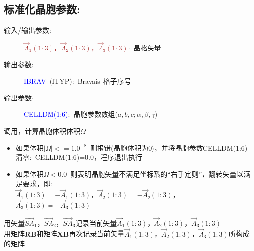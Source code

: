 \documentclass{article}      %
\begin{document}
\subsection{标准化晶胞参数:}
\begin{description}
	\item[输入/输出参数:~]\textcolor{brown}{$\vec A_1(1:3)$，$\vec A_2(1:3)$，$\vec A_3(1:3)$}:~晶格矢量
	\item[输出参数:~]\textcolor{blue}{\textrm{IBRAV~}}(ITYP):~\textrm{Bravais~}格子序号
	\item[输出参数:~]\textcolor{blue}{\textrm{CELLDM}(1:6)}:~晶胞参数数组($a,b,c;\alpha,\beta,\gamma$)
\end{description}
调用，计算晶胞体积体积$\Omega$
\begin{itemize}
	\item 如果体积$|\Omega|<=1.0^{-8}$~则报错(晶胞体积为0)，并将晶胞参数\textrm{CELLDM}(1:6)清零:~\textrm{CELLDM(1:6)}=0.0，程序退出执行
	\item 如果体积$\Omega< 0.0$~则表明晶胞矢量不满足坐标系的“右手定则”，翻转矢量以满足要求，即:\\$\vec A_1(1:3)=-\vec A_1(1:3)$，$\vec A_2(1:3)=-\vec A_2(1:3)$，$\vec A_3(1:3)=-\vec A_3(1:3)$
\end{itemize}
用矢量$\vec{SA}_1$，$\vec{SA}_2$，$\vec{SA}_3$记录当前矢量$\vec A_1(1:3)$，$\vec A_2(1:3)$，$\vec A_3(1:3)$\\
用矩阵$\mathbf{RB}$和矩阵$\mathbf{XB}$再次记录当前矢量$\vec A_1(1:3)$，$\vec A_2(1:3)$，$\vec A_3(1:3)$所构成的矩阵\\
\end{document}
